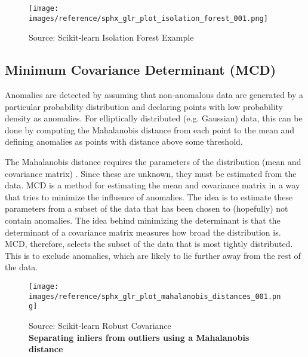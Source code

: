 \documentclass{article}
\begin{document}
    \begin{figure}[!ht]
        \texttt{[image: images/reference/sphx\_glr\_plot\_isolation\_forest\_001.png]}
        \caption{Source: Scikit-learn Isolation Forest Example \cite{thirteen}}
        \label{fig:scikit-learn-iforest-example}
    \end{figure}
    
\subsection{Minimum Covariance Determinant (MCD)}
Anomalies are detected by assuming that non-anomalous data are generated by a particular probability distribution and declaring points with low probability density as anomalies. For elliptically distributed (e.g. Gaussian) data, this can be done by computing the Mahalanobis distance from each point to the mean and defining anomalies as points with distance above some threshold. \par 
The Mahalanobis distance requires the parameters of the distribution (mean and covariance matrix) \cite{fourteen}. Since these are unknown, they must be estimated from the data.
MCD \cite{six} is a method for estimating the mean and covariance matrix in a way that tries to minimize the influence of anomalies. The idea is to estimate these parameters from a subset of the data that has been chosen to (hopefully) not contain anomalies. The idea behind minimizing the determinant is that the determinant of a covariance matrix measures how broad the distribution is. MCD, therefore, selects the subset of the data that is most tightly distributed. This is to exclude anomalies, which are likely to lie further away from the rest of the data. \par

    \begin{figure}[!ht]       
        \texttt{[image: images/reference/sphx\_glr\_plot\_mahalanobis\_distances\_001.png]}
        \caption{Source: Scikit-learn Robust Covariance \cite{fifteen} \\ \textbf{Separating inliers from outliers using a Mahalanobis distance}}
        \label{fig:scikit-learn-mcd2-example}        
    \end{figure}
\end{document}
